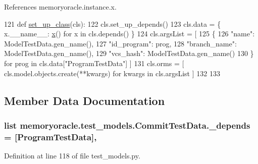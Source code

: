 References memoryoracle.\+instance.\+x.


\begin{DoxyCode}
121     \textcolor{keyword}{def }\hyperlink{classmemoryoracle_1_1test__models_1_1CommitTestData_a27d442f991377050929bb9dde59ac3ee}{set\_up\_class}(cls):
122         cls.set\_up\_depends()
123         cls.data = \{ x.\_\_name\_\_: \hyperlink{namespacememoryoracle_1_1instance_afe036cc8dc71469743d090c4c80d50c5}{x}() \textcolor{keywordflow}{for} x \textcolor{keywordflow}{in} cls.depends() \}
124         cls.argsList = [
125                 \{
126                     \textcolor{stringliteral}{"name"}: ModelTestData.gen\_name(),
127                     \textcolor{stringliteral}{"id\_program"}: prog,
128                     \textcolor{stringliteral}{"branch\_name"}: ModelTestData.gen\_name(),
129                     \textcolor{stringliteral}{"vcs\_hash"}: ModelTestData.gen\_name()
130                 \} \textcolor{keywordflow}{for} prog \textcolor{keywordflow}{in} cls.data[\textcolor{stringliteral}{"ProgramTestData"}] ]
131         cls.orms = [ cls.model.objects.create(**kwargs) \textcolor{keywordflow}{for} kwargs \textcolor{keywordflow}{in} cls.argsList ]
132 
133 
\end{DoxyCode}


\subsection{Member Data Documentation}
\hypertarget{classmemoryoracle_1_1test__models_1_1CommitTestData_ab91d93619fdbadba1be0780696886cdf}{}
\subsubsection[{\+\_\+depends}]{\setlength{\rightskip}{0pt plus 5cm}list memoryoracle.\+test\+\_\+models.\+Commit\+Test\+Data.\+\_\+depends = \mbox{[}{\bf Program\+Test\+Data}\mbox{]}\hspace{0.3cm}{\ttfamily [static]}, {\ttfamily [private]}}\label{classmemoryoracle_1_1test__models_1_1CommitTestData_ab91d93619fdbadba1be0780696886cdf}


Definition at line 118 of file test\+\_\+models.\+py.

\hypertarget{classmemoryoracle_1_1test__models_1_1CommitTestData_a1d7335c322637a6769200489933b9338}{}

